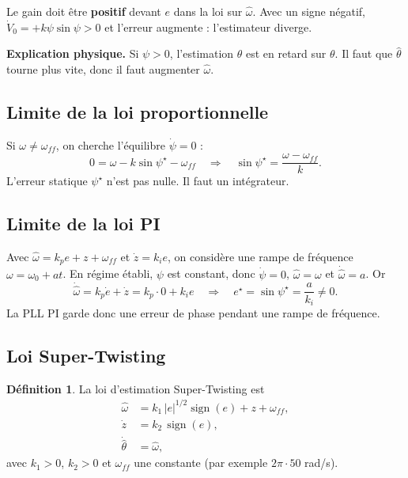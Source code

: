 \documentclass[11pt,a4paper]{article}
\numberwithin{equation}{section}
\theoremstyle{plain}
\theoremstyle{definition}
\newtheorem{definition}[theoreme]{Définition}
\theoremstyle{remark}
\newcommand{\sign}{\operatorname{sign}}
\newcommand{\hth}{\hat{\theta}}
\newcommand{\hw}{\hat{\omega}}
\newcommand{\wff}{\omega_{ff}}
\begin{document}
\begin{resultat}
Le gain doit être \textbf{positif} devant $e$ dans la loi sur $\hw$. Avec un signe négatif,
$\dot V_0 = +k\psi\sin\psi>0$ et l'erreur augmente : l'estimateur diverge.
\end{resultat}

\textbf{Explication physique.} Si $\psi>0$, l'estimation $\hth$ est en retard sur $\theta$.
Il faut que $\hth$ tourne plus vite, donc il faut augmenter $\hw$.

\subsection{Limite de la loi proportionnelle}
Si $\omega\neq\wff$, on cherche l'équilibre $\dot\psi=0$ :
\begin{equation}
0 = \omega - k\sin\psi^\star-\wff \quad\Longrightarrow\quad \sin\psi^\star = \frac{\omega-\wff}{k}.
\end{equation}
L'erreur statique $\psi^\star$ n'est pas nulle. Il faut un intégrateur.

\subsection{Limite de la loi PI}\label{sec:pi}
Avec $\hw = k_pe + z + \wff$ et $\dot z = k_ie$, on considère une rampe de fréquence
$\omega = \omega_0 + at$. En régime établi, $\psi$ est constant, donc $\dot\psi=0$, $\hw=\omega$
et $\dot\hw = a$. Or
\begin{equation}
\dot\hw = k_p\dot e + \dot z = k_p\cdot 0 + k_ie \quad\Longrightarrow\quad e^\star = \sin\psi^\star = \frac{a}{k_i}\neq 0 .
\end{equation}
La PLL PI garde donc une erreur de phase pendant une rampe de fréquence.

\subsection{Loi Super-Twisting}
\begin{definition}
La loi d'estimation Super-Twisting est
\begin{align}
\hw &= k_1\,|e|^{1/2}\sign(e) + z + \wff, \label{eq:st1}\\
\dot z &= k_2\,\sign(e), \label{eq:st2}\\
\dot\hth &= \hw , \label{eq:st3}
\end{align}
avec $k_1>0$, $k_2>0$ et $\wff$ une constante (par exemple $2\pi\cdot50$ rad/s).
\end{definition}
\end{document}
